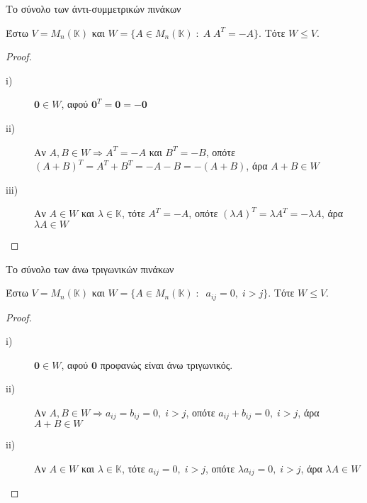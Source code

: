 \begin{examples}
\begin{enumerate}
        \item \textcolor{Col2}{Το σύνολο των άντι-συμμετρικών πινάκων}

            Έστω $ V = M_{n}(\mathbb{K}) $ και $ W = \{ A \in M_{n}(\mathbb{K}) \;
            : \; A \; A^{T}=-A \}  $. Τότε $ W \leq V $.
            \begin{proof}
            \item {}
                \begin{description}
                    \item [i)] $ \mathbf{0} \in W $, αφού $ \mathbf{0}^{T}= 
                        \mathbf{0} = - \mathbf{0} $
                    \item [ii)]
                        Αν $ A, B \in W \Rightarrow A^{T}=-A $ και $ B^{T}=-B $, οπότε
                        $ (A+B)^{T}= A^{T}+B^{T}=-A-B = - (A+B) $, άρα $A+B \in W$
                    \item[iii)] Αν $ A \in W $ και $ \lambda \in \mathbb{K} $, τότε 
                        $A^{T}=-A$, οπότε $(\lambda A)^{T} = \lambda A^{T} =
                        -\lambda A  $, άρα $ \lambda A \in W $
                \end{description}
            \end{proof}

        \item \textcolor{Col2}{Το σύνολο των άνω τριγωνικών πινάκων}

            Έστω $ V = M_{n}(\mathbb{K}) $ και $ W = \{ A \in M_{n}(\mathbb{K}) \;
            : \; \; a_{ij} = 0, \; i>j \}  $. Τότε $ W \leq V $.

            \begin{proof}
            \item {}
                \begin{description}
                    \item [i)] $ \mathbf{0} \in W $, αφού $ \mathbf{0} $ 
                        προφανώς είναι άνω τριγωνικός.
                    \item [ii)] Αν $ A, B \in W \Rightarrow a_{ij} = b_{ij} = 0, 
                        \; i>j$, οπότε $a_{ij} + b_{ij} = 0, \; i>j$, άρα $A+B \in W$
                    \item[ii)] Αν $ A \in W $ και $ \lambda \in \mathbb{K} $, τότε 
                        $a_{ij} = 0, \; i>j$, οπότε $ \lambda a_{ij} = 0, \; i>j$, 
                        άρα $ \lambda A \in W $
                \end{description}
            \end{proof}


\end{enumerate}
\end{examples}
